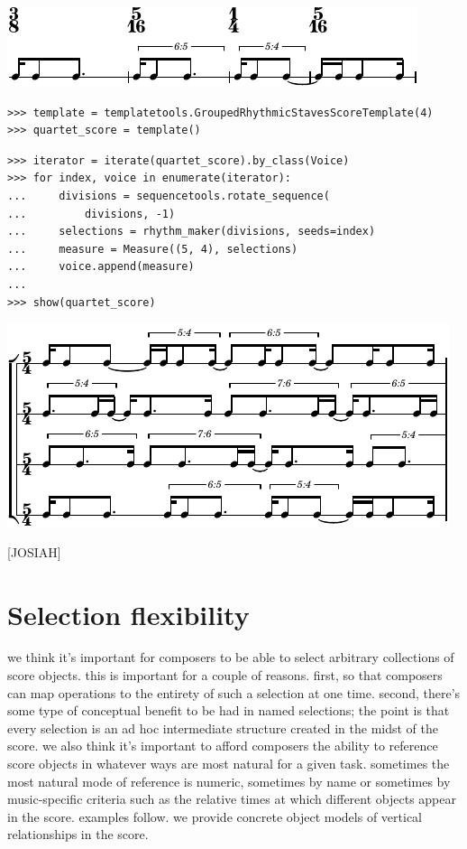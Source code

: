 \documentclass{article}
\begin{document}
\noindent\includegraphics[scale=1.0]{images/abjad-5.pdf}


\begin{lstlisting}
>>> template = templatetools.GroupedRhythmicStavesScoreTemplate(4)
>>> quartet_score = template()
\end{lstlisting}


\begin{lstlisting}
>>> iterator = iterate(quartet_score).by_class(Voice)
>>> for index, voice in enumerate(iterator):
...     divisions = sequencetools.rotate_sequence(
...         divisions, -1)
...     selections = rhythm_maker(divisions, seeds=index)
...     measure = Measure((5, 4), selections)
...     voice.append(measure)
... 
>>> show(quartet_score)
\end{lstlisting}

\noindent\includegraphics[scale=1.0]{images/abjad-6.pdf}


[JOSIAH]



\section{Selection flexibility}

we think it's important for composers to be able to select arbitrary
collections of score objects. this is important for a couple of reasons. first,
so that composers can map operations to the entirety of such a selection at one
time. second, there's some type of conceptual benefit to be had in named
selections; the point is that every selection is an ad hoc intermediate
structure created in the midst of the score. we also think it's important to
afford composers the ability to reference score objects in whatever ways are
most natural for a given task. sometimes the most natural mode of reference is
numeric, sometimes by name or sometimes by music-specific criteria such as the
relative times at which different objects appear in the score. examples follow.
we provide concrete object models of vertical relationships in the score.
\end{document}
